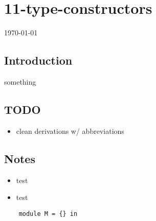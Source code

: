 \documentclass[12pt]{article}
\begin{document}
\section*{11-type-constructors}
\today
\subsection*{Introduction}
something
\subsection*{TODO}
\begin{itemize}
    \item clean derivations w/ abbreviations
\end{itemize}
\subsection*{Notes}
\begin{itemize}
    \item test
    \item test
\end{itemize}
\begin{verbatim}
    module M = {} in
\end{verbatim}
\end{document}

